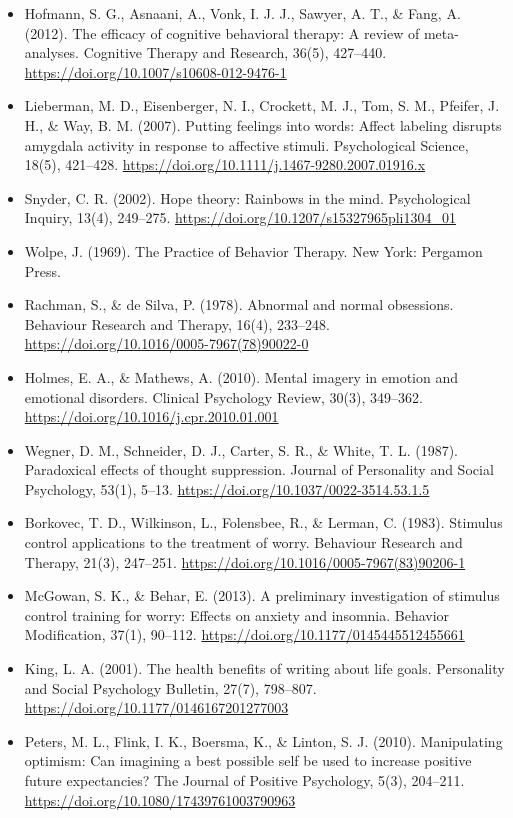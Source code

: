 \documentclass[10pt]{article}
\theoremstyle{remark}
\begin{document}
\begin{itemize}[leftmargin=1em,itemsep=0pt,topsep=1pt,parsep=0pt]
\item Hofmann, S. G., Asnaani, A., Vonk, I. J. J., Sawyer, A. T., \& Fang, A. (2012). The efficacy of cognitive behavioral therapy: A review of meta-analyses. Cognitive Therapy and Research, 36(5), 427--440. \url{https://doi.org/10.1007/s10608-012-9476-1}
\item Lieberman, M. D., Eisenberger, N. I., Crockett, M. J., Tom, S. M., Pfeifer, J. H., \& Way, B. M. (2007). Putting feelings into words: Affect labeling disrupts amygdala activity in response to affective stimuli. Psychological Science, 18(5), 421--428. \url{https://doi.org/10.1111/j.1467-9280.2007.01916.x}
\item Snyder, C. R. (2002). Hope theory: Rainbows in the mind. Psychological Inquiry, 13(4), 249--275. \url{https://doi.org/10.1207/s15327965pli1304_01}
\item Wolpe, J. (1969). The Practice of Behavior Therapy. New York: Pergamon Press.
\item Rachman, S., \& de Silva, P. (1978). Abnormal and normal obsessions. Behaviour Research and Therapy, 16(4), 233--248. \url{https://doi.org/10.1016/0005-7967(78)90022-0}
\item Holmes, E. A., \& Mathews, A. (2010). Mental imagery in emotion and emotional disorders. Clinical Psychology Review, 30(3), 349--362. \url{https://doi.org/10.1016/j.cpr.2010.01.001}
\item Wegner, D. M., Schneider, D. J., Carter, S. R., \& White, T. L. (1987). Paradoxical effects of thought suppression. Journal of Personality and Social Psychology, 53(1), 5--13. \url{https://doi.org/10.1037/0022-3514.53.1.5}
\item Borkovec, T. D., Wilkinson, L., Folensbee, R., \& Lerman, C. (1983). Stimulus control applications to the treatment of worry. Behaviour Research and Therapy, 21(3), 247--251. \url{https://doi.org/10.1016/0005-7967(83)90206-1}
\item McGowan, S. K., \& Behar, E. (2013). A preliminary investigation of stimulus control training for worry: Effects on anxiety and insomnia. Behavior Modification, 37(1), 90--112. \url{https://doi.org/10.1177/0145445512455661}
\item King, L. A. (2001). The health benefits of writing about life goals. Personality and Social Psychology Bulletin, 27(7), 798--807. \url{https://doi.org/10.1177/0146167201277003}
\item Peters, M. L., Flink, I. K., Boersma, K., \& Linton, S. J. (2010). Manipulating optimism: Can imagining a best possible self be used to increase positive future expectancies? The Journal of Positive Psychology, 5(3), 204--211. \url{https://doi.org/10.1080/17439761003790963}

\end{itemize}
\end{document}
